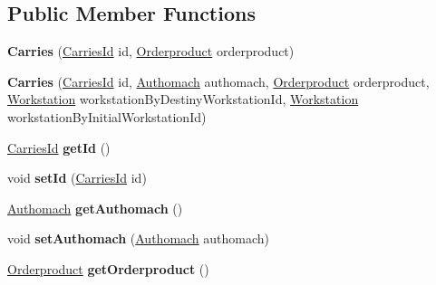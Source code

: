 \subsection*{Public Member Functions}
\begin{DoxyCompactItemize}
\item 
\mbox{\label{classentity_1_1_carries_acf6db6a8bebc1383fb44b5d1a69db994}} 
{\bfseries Carries} (\mbox{\hyperlink{classentity_1_1_carries_id}{Carries\+Id}} id, \mbox{\hyperlink{classentity_1_1_orderproduct}{Orderproduct}} orderproduct)
\item 
\mbox{\label{classentity_1_1_carries_a61138413c175da3c338dd6d3faf5034d}} 
{\bfseries Carries} (\mbox{\hyperlink{classentity_1_1_carries_id}{Carries\+Id}} id, \mbox{\hyperlink{classentity_1_1_authomach}{Authomach}} authomach, \mbox{\hyperlink{classentity_1_1_orderproduct}{Orderproduct}} orderproduct, \mbox{\hyperlink{classentity_1_1_workstation}{Workstation}} workstation\+By\+Destiny\+Workstation\+Id, \mbox{\hyperlink{classentity_1_1_workstation}{Workstation}} workstation\+By\+Initial\+Workstation\+Id)
\item 
\mbox{\label{classentity_1_1_carries_af1a678cc4d0ded3e9fecbf0a17a2ba3c}} 
\mbox{\hyperlink{classentity_1_1_carries_id}{Carries\+Id}} {\bfseries get\+Id} ()
\item 
\mbox{\label{classentity_1_1_carries_a23d2ab3f05610f37bca03e7cc08ced73}} 
void {\bfseries set\+Id} (\mbox{\hyperlink{classentity_1_1_carries_id}{Carries\+Id}} id)
\item 
\mbox{\label{classentity_1_1_carries_a539e6149274e7be94d86999d02af82d1}} 
\mbox{\hyperlink{classentity_1_1_authomach}{Authomach}} {\bfseries get\+Authomach} ()
\item 
\mbox{\label{classentity_1_1_carries_a5fddad71e78d3206116e710916c8bb74}} 
void {\bfseries set\+Authomach} (\mbox{\hyperlink{classentity_1_1_authomach}{Authomach}} authomach)
\item 
\mbox{\label{classentity_1_1_carries_a6439c3d458849f3f5d87c0f9577fc16b}} 
\mbox{\hyperlink{classentity_1_1_orderproduct}{Orderproduct}} {\bfseries get\+Orderproduct} ()

\end{DoxyCompactItemize}
